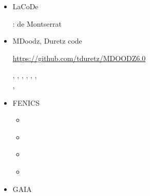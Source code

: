 \begin{itemize}
\cite{maierova}
\cite{mals14}

\item {\codefont LaCoDe}  

\begin{scriptsize}
\noindent
\twothousandnineteen: de Montserrat \etal \cite{demh19}
\end{scriptsize}

\item {\codefont MDoodz}, Duretz code

\url{https://github.com/tduretz/MDOODZ6.0}

\begin{scriptsize}
\twothousandtwelve
\textcite{yatd12}
\twothousandthirteen
\textcite{yahb13}
\twothousandfifteen
\textcite{yadm15}
\twothousandsixteen
\textcite{dumy16}, \textcite{dupm16}
\twothousandnineteen
\textcite{chmd19}, \textcite{dual19}, \textcite{pedm19}
\twothousandtwenty
\textcite{poyd20}, \textcite{bedh20}, \textcite{chsm20}, \textcite{auwy20}\\
\twothousandtwentyone \textcite{pody21}, \textcite{cadm21}
\textcite{auwy21}
\twothousandtwentytwo 
\textcite{auyd22} \textcite{yadb22}
\end{scriptsize}

\item {\codefont FENICS} 

\begin{scriptsize}
\begin{itemize}
\item[\twothousandfourteen]  \textcite{alrk14}
\item[\twothousandseventeen] \textcite{jidb17}
\item[\twothousandtwenty]    \textcite{resi20}
\item[\twothousandtwentyone] \textcite{josv21}
\end{itemize}
\end{scriptsize}


\item {\codefont GAIA} 


\end{itemize}
